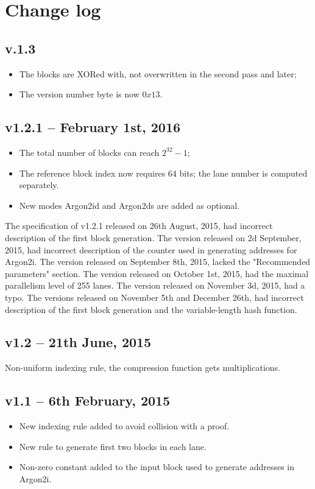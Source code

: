 \documentclass[a4paper]{article}
\begin{document}
\section{Change log}

\subsection{v.1.3}

\begin{itemize}
    \item The blocks are XORed with, not overwritten in the second pass and later;
    \item The version number byte is now $0x13$.
\end{itemize}

\subsection{v1.2.1 -- February 1st, 2016}
\begin{itemize}
\item The total number of blocks can reach $2^{32}-1$;
\item The reference block index now requires 64 bits; the lane number is computed separately.
\item New modes \textsf{Argon2id} and \textsf{Argon2ds} are added as optional.
\end{itemize}
The specification of v1.2.1 released on 26th August, 2015, had incorrect description of the first block generation. The version released on 2d September, 2015, had incorrect description of the counter used in generating addresses for \textsf{Argon2i}. The version released on September 8th, 2015, lacked the "Recommended parameters" section. The version released on October 1st, 2015, 
had the maximal parallelism level of 255 lanes. The version released on November 3d, 2015, had a typo. The versions released on November 5th and December 26th, had incorrect description of the first block generation and the variable-length hash function.

\subsection{v1.2  -- 21th June, 2015}

Non-uniform  indexing rule, the compression function gets multiplications.

\subsection{v1.1  -- 6th February, 2015}
\begin{itemize}
\item New indexing rule added to avoid collision with a proof. 
\item New rule to generate first two blocks in each lane.
\item Non-zero constant added to the input block used to generate addresses in \textsf{Argon2i}.
\end{itemize}
\end{document}
